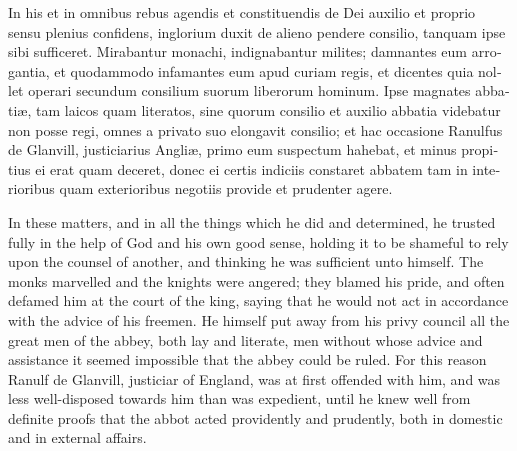 \documentclass{book}
\begin{document}
\begin{paracol}{2}
\switchcolumn*

\begin{otherlanguage}{latin}
In his et in omnibus rebus agendis et constituendis de Dei auxilio et proprio sensu plenius confidens, inglorium duxit de alieno pendere consilio, tanquam ipse sibi sufficeret. Mirabantur monachi, indignabantur milites; damnantes eum arrogantia, et quodammodo infamantes eum apud curiam regis, et dicentes quia nollet operari secundum consilium suorum liberorum hominum. Ipse magnates abbati\ae{}, tam laicos quam literatos, sine quorum consilio et auxilio abbatia videbatur non posse regi, omnes a privato suo elongavit consilio; et hac occasione Ranulfus de Glanvill, justiciarius Angli\ae{}, primo eum suspectum hahebat, et minus propitius ei erat quam deceret, donec ei certis indiciis constaret abbatem tam in interioribus quam exterioribus negotiis provide et prudenter agere.
\end{otherlanguage}

\switchcolumn

In these matters, and in all the things which he did and determined, he trusted fully in the help of God and his own good sense, holding it to be shameful to rely upon the counsel of another, and thinking he was sufficient unto himself. The monks marvelled and the knights were angered; they blamed his pride, and often defamed him at the court of the king, saying that he would not act in accordance with the advice of his freemen. He himself put away from his privy council all the great men of the abbey, both lay and literate, men without whose advice and assistance it seemed impossible that the abbey could be ruled. For this reason Ranulf de Glanvill, justiciar of England, was at first offended with him, and was less well-disposed towards him than was expedient, until he knew well from definite proofs that the abbot acted providently and prudently, both in domestic and in external affairs.

\switchcolumn*


\end{paracol}
\end{document}
